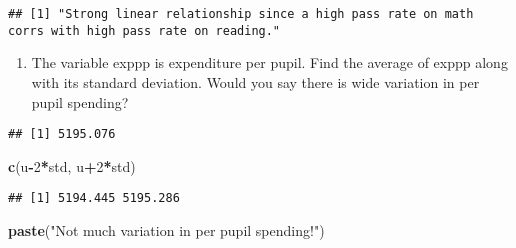 \documentclass[]{article}
\newenvironment{Shaded}{\begin{snugshade}}{\end{snugshade}}
\newcommand{\KeywordTok}[1]{\textcolor[rgb]{0.13,0.29,0.53}{\textbf{#1}}}
\newcommand{\DecValTok}[1]{\textcolor[rgb]{0.00,0.00,0.81}{#1}}
\newcommand{\StringTok}[1]{\textcolor[rgb]{0.31,0.60,0.02}{#1}}
\newcommand{\OperatorTok}[1]{\textcolor[rgb]{0.81,0.36,0.00}{\textbf{#1}}}
\newcommand{\NormalTok}[1]{#1}
\providecommand{\tightlist}{%
  \setlength{\itemsep}{0pt}\setlength{\parskip}{0pt}}
\begin{document}
\begin{verbatim}
## [1] "Strong linear relationship since a high pass rate on math corrs with high pass rate on reading."
\end{verbatim}

\begin{enumerate}
\def\labelenumi{\arabic{enumi}.}
\setcounter{enumi}{5}
\tightlist
\item
  The variable exppp is expenditure per pupil. Find the average of exppp
  along with its standard deviation. Would you say there is wide
  variation in per pupil spending?
\end{enumerate}

\begin{Shaded}
\end{Shaded}

\begin{verbatim}
## [1] 5195.076
\end{verbatim}

\begin{Shaded}
\begin{Highlighting}[]
\KeywordTok{c}\NormalTok{(u}\OperatorTok{-}\DecValTok{2}\OperatorTok{*}\NormalTok{std, u}\OperatorTok{+}\DecValTok{2}\OperatorTok{*}\NormalTok{std)}
\end{Highlighting}
\end{Shaded}

\begin{verbatim}
## [1] 5194.445 5195.286
\end{verbatim}

\begin{Shaded}
\begin{Highlighting}[]
\KeywordTok{paste}\NormalTok{(}\StringTok{"Not much variation in per pupil spending!"}\NormalTok{)}
\end{Highlighting}
\end{Shaded}
\end{document}
